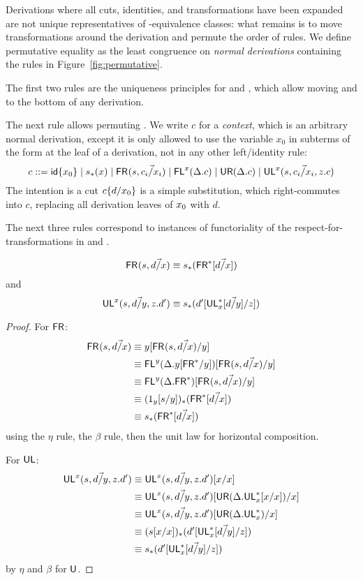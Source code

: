 Derivations where all cuts, identities, and transformations have been
expanded are not unique representatives of \deq-equivalence classes:
what remains is to move transformations around the derivation and
permute the order of rules.  We define permutative equality as the least
congruence on \emph{normal derivations} containing the rules in
Figure~\ref{fig:permutative}.

The first two rules are the uniqueness principles for \Fsymb\/ and
\Usymb\/, which allow moving \FL\/ and \UR\/ to the bottom of any
derivation.  

The next rule allows permuting \UL.  We write $c$ for a \emph{context},
which is an arbitrary normal derivation, except it is only allowed to
use the variable $x_0$ in subterms of the form  at the leaf
of a derivation, not in any other left/identity rule:
\[
c ::= {\mathsf{id}\{x_0\}} \mid s_*(x) \mid \mathsf{FR}_{}(s,\vec{c_i/x_i}) \mid \mathsf{FL}^{x}(\Delta.c) \mid \mathsf{UR}(\Delta.c) \mid \mathsf{UL}^{x}_{}(s,\vec{c_i/x_i},z.c)
\]
The intention is a cut $c\{d/x_0\}$ is a simple substitution,
which right-commutes into $c$, replacing all derivation leaves of
${x_0}$ with $d$.  

The next three rules correspond to instances of
functoriality of the respect-for-transformations in \UL\/ and \FR\/.

\begin{lemma}
\[\mathsf{FR}_{}(s,\vec{d/x}) \equiv s_*(\mathsf{FR}^*[\vec{d/x}])\] and
 \[\mathsf{UL}^{x}_{}(s,\vec{d/y},z.d') \equiv s_*(d'[\mathsf{UL}^*_{x}[\vec{d/y}]/z])\]
\end{lemma}
\begin{proof}
For $\mathsf{FR}$:
\begin{align*}
\mathsf{FR}_{}(s,\vec{d/x}) 
&\equiv y[\mathsf{FR}_{}(s,\vec{d/x})/y] \\
&\equiv \mathsf{FL}^{y}(\Delta.y[\mathsf{FR}^*/y])[\mathsf{FR}_{}(s,\vec{d/x})/y] \\
&\equiv \mathsf{FL}^{y}(\Delta.\mathsf{FR}^*)[\mathsf{FR}_{}(s,\vec{d/x})/y] \\
&\equiv (1_y[s/y])_*(\mathsf{FR}^*[\vec{d/x}]) \\
&\equiv s_*(\mathsf{FR}^*[\vec{d/x}])
\end{align*}
using the $\eta$ rule, the $\beta$ rule, then the unit law for horizontal composition.

For $\mathsf{UL}$:
\begin{align*}
\mathsf{UL}^{x}_{}(s,\vec{d/y},z.d')
&\equiv \mathsf{UL}^{x}_{}(s,\vec{d/y},z.d')[x/x] \\
&\equiv \mathsf{UL}^{x}_{}(s,\vec{d/y},z.d')[\mathsf{UR}(\Delta.\mathsf{UL}^*_{x}[x/x])/x] \\
&\equiv \mathsf{UL}^{x}_{}(s,\vec{d/y},z.d')[\mathsf{UR}(\Delta.\mathsf{UL}^*_{x})/x] \\
&\equiv (s[x/x])_*(d'[\mathsf{UL}^*_{x}[\vec{d/y}]/z]) \\
&\equiv s_*(d'[\mathsf{UL}^*_{x}[\vec{d/y}]/z])
\end{align*}
by $\eta$ and $\beta$ for $\mathsf{U}$.
\end{proof}


